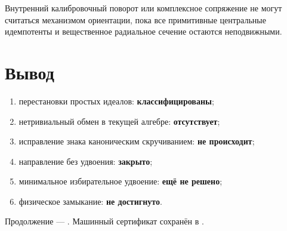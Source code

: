 \begin{nogocriterion}
Внутренний калибровочный поворот или комплексное сопряжение не могут
считаться механизмом ориентации, пока все примитивные центральные идемпотенты
и вещественное радиальное сечение остаются неподвижными.
\end{nogocriterion}

\section{Вывод}

\begin{protocol}
\begin{enumerate}
 \item перестановки простых идеалов: \textbf{классифицированы};
 \item нетривиальный обмен в текущей алгебре: \textbf{отсутствует};
 \item исправление знака каноническим скручиванием:
 \textbf{не происходит};
 \item направление без удвоения: \textbf{закрыто};
 \item минимальное избирательное удвоение: \textbf{ещё не решено};
 \item физическое замыкание: \textbf{не достигнуто}.
\end{enumerate}
\end{protocol}

Продолжение --- .
Машинный сертификат сохранён в
.